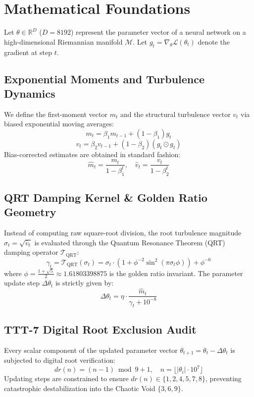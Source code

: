 \section{Mathematical Foundations}
Let $\theta \in \mathbb{R}^D$ ($D = 8192$) represent the parameter vector of a neural network on a high-dimensional Riemannian manifold $\mathcal{M}$. Let $g_t = \nabla_\theta \mathcal{L}(\theta_t)$ denote the gradient at step $t$.

\subsection{Exponential Moments and Turbulence Dynamics}
We define the first-moment vector $m_t$ and the structural turbulence vector $v_t$ via biased exponential moving averages:
\begin{equation}
    m_t = \beta_1 m_{t-1} + (1 - \beta_1) g_t
\end{equation}
\begin{equation}
    v_t = \beta_2 v_{t-1} + (1 - \beta_2) (g_t \odot g_t)
\end{equation}
Bias-corrected estimates are obtained in standard fashion:
\begin{equation}
    \hat{m}_t = \frac{m_t}{1 - \beta_1^t}, \quad \hat{v}_t = \frac{v_t}{1 - \beta_2^t}
\end{equation}

\subsection{QRT Damping Kernel \& Golden Ratio Geometry}
Instead of computing raw square-root division, the root turbulence magnitude $\sigma_t = \sqrt{\hat{v}_t}$ is evaluated through the Quantum Resonance Theorem (QRT) damping operator $\mathcal{T}_{\text{QRT}}$:
\begin{equation}
    \gamma_t = \mathcal{T}_{\text{QRT}}(\sigma_t) = \sigma_t \cdot \left(1 + \phi^{-2} \sin^2\left(\pi \sigma_t \phi\right)\right) + \phi^{-6}
\end{equation}
where $\phi = \frac{1+\sqrt{5}}{2} \approx 1.61803398875$ is the golden ratio invariant. The parameter update step $\Delta \theta_t$ is strictly given by:
\begin{equation}
    \Delta \theta_t = \eta \cdot \frac{\hat{m}_t}{\gamma_t + 10^{-8}}
\end{equation}

\subsection{TTT-7 Digital Root Exclusion Audit}
Every scalar component of the updated parameter vector $\theta_{t+1} = \theta_t - \Delta \theta_t$ is subjected to digital root verification:
\begin{equation}
    dr(n) = (n - 1) \bmod 9 + 1, \quad n = \lfloor |\theta_{i}| \cdot 10^7 \rfloor
\end{equation}
Updating steps are constrained to ensure $dr(n) \in \{1, 2, 4, 5, 7, 8\}$, preventing catastrophic destabilization into the Chaotic Void $\{3, 6, 9\}$.
